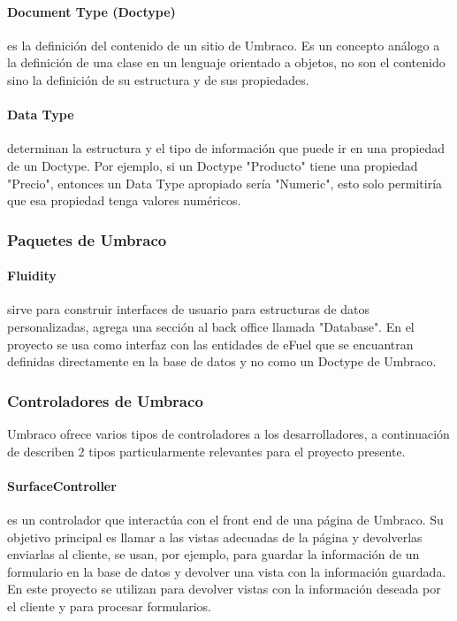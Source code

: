     \paragraph{Document Type (Doctype)} es la definición del contenido de un sitio de Umbraco. Es un concepto análogo a la definición de una clase en un lenguaje orientado a objetos, no son el contenido sino la definición de su estructura y de sus propiedades.
    \paragraph{Data Type} determinan la estructura y el tipo de información que puede ir en una propiedad de un Doctype. Por ejemplo, si un Doctype "Producto" tiene una propiedad "Precio", entonces un Data Type apropiado sería "Numeric", esto solo permitiría que esa propiedad tenga valores numéricos.

    \subsubsection{Paquetes de Umbraco}
    \paragraph{Fluidity} sirve para construir interfaces de usuario para estructuras de datos personalizadas, agrega una sección al back office llamada "Database". En el proyecto se usa como interfaz con las entidades de eFuel que se encuantran definidas directamente en la base de datos y no como un Doctype de Umbraco.

    \subsubsection{Controladores de Umbraco}
    Umbraco ofrece varios tipos de controladores a los desarrolladores, a continuación de describen 2 tipos particularmente relevantes para el proyecto presente.
    \paragraph{SurfaceController} es un controlador que interactúa con el front end de una página de Umbraco. \cite{surfaceController} Su objetivo principal es llamar a las vistas adecuadas de la página y devolverlas enviarlas al cliente, se usan, por ejemplo, para guardar la información de un formulario en la base de datos y devolver una vista con la información guardada. En este proyecto se utilizan para devolver vistas con la información deseada por el cliente y para procesar formularios.
